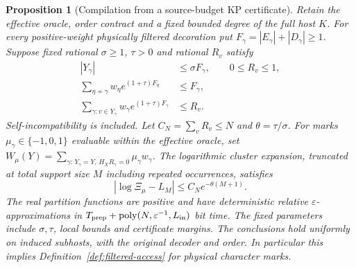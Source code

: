\documentclass[10pt,twocolumn]{article}
\newtheorem{proposition}[theorem]{Proposition}
\theoremstyle{definition}
\DeclareMathOperator{\poly}{poly}
\newcommand{\Lin}{L_{\mathrm{in}}}
\begin{document}
\begin{proposition}[Compilation from a source-budget KP certificate]
\label{prop:kp-filtered-compiler}
Retain the effective oracle, order contract and a fixed bounded degree
of the full host $K$. For every positive-weight physically filtered
decoration put $F_\gamma=|E_\gamma|+|D_\gamma|\ge1$. Suppose fixed rational
$\sigma\ge1$, $\tau>0$ and rational $R_v$ satisfy
\begin{equation}\label{eq:kp-filtered-certificate}
\begin{split}
 |Y_\gamma|&\le\sigma F_\gamma,\qquad 0\le R_v\le1,\\
 \sum_{\eta\not\sim\gamma}w_\eta e^{(1+\tau)F_\eta}
       &\le F_\gamma,\\
 \sum_{\gamma:v\in Y_\gamma}w_\gamma e^{(1+\tau)F_\gamma}
       &\le R_v .
\end{split}
\end{equation}
Self-incompatibility is included. Let $C_N=\sum_v R_v\le N$ and
$\theta=\tau/\sigma$. For marks $\mu_\gamma\in\{-1,0,1\}$ evaluable
within the effective oracle, set
$W_\mu(Y)=\sum_{\gamma:\,Y_\gamma=Y,\,H_XR_\gamma=0}\mu_\gamma w_\gamma$.
The logarithmic cluster expansion, truncated at total support size $M$
including repeated occurrences, satisfies
\begin{equation}\label{eq:kp-filtered-tail}
 |\log\Xi_\mu-L_M|\le C_N e^{-\theta(M+1)}.
\end{equation}
The real partition functions are positive and have deterministic relative
$\varepsilon$-approximations in
$T_{\rm prep}+\poly(N,\varepsilon^{-1},\Lin)$ bit time. The fixed
parameters include $\sigma,\tau$, local bounds and certificate margins.
The conclusions hold uniformly on induced subhosts, with the original
decoder and order. In particular this implies
Definition~\ref{def:filtered-access} for physical character marks.
\end{proposition}
\end{document}
